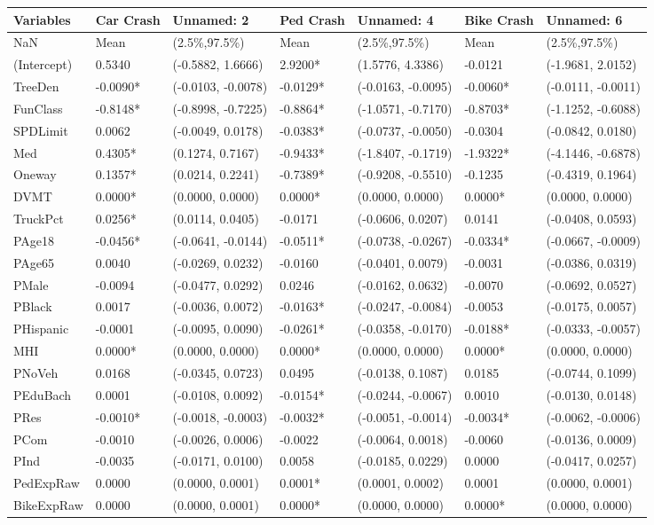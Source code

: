 \begin{tabular}{lllllll}
\toprule
Variables & Car Crash & Unnamed: 2 & Ped Crash & Unnamed: 4 & Bike Crash & Unnamed: 6 \\
\midrule
NaN & Mean & (2.5\%,97.5\%) & Mean & (2.5\%,97.5\%) & Mean & (2.5\%,97.5\%) \\
(Intercept) & 0.5340 & (-0.5882, 1.6666) & 2.9200* & (1.5776, 4.3386) & -0.0121 & (-1.9681, 2.0152) \\
TreeDen & -0.0090* & (-0.0103, -0.0078) & -0.0129* & (-0.0163, -0.0095) & -0.0060* & (-0.0111, -0.0011) \\
FunClass & -0.8148* & (-0.8998, -0.7225) & -0.8864* & (-1.0571, -0.7170) & -0.8703* & (-1.1252, -0.6088) \\
SPDLimit & 0.0062 & (-0.0049, 0.0178) & -0.0383* & (-0.0737, -0.0050) & -0.0304 & (-0.0842, 0.0180) \\
Med & 0.4305* & (0.1274, 0.7167) & -0.9433* & (-1.8407, -0.1719) & -1.9322* & (-4.1446, -0.6878) \\
Oneway & 0.1357* & (0.0214, 0.2241) & -0.7389* & (-0.9208, -0.5510) & -0.1235 & (-0.4319, 0.1964) \\
DVMT & 0.0000* & (0.0000, 0.0000) & 0.0000* & (0.0000, 0.0000) & 0.0000* & (0.0000, 0.0000) \\
TruckPct & 0.0256* & (0.0114, 0.0405) & -0.0171 & (-0.0606, 0.0207) & 0.0141 & (-0.0408, 0.0593) \\
PAge18 & -0.0456* & (-0.0641, -0.0144) & -0.0511* & (-0.0738, -0.0267) & -0.0334* & (-0.0667, -0.0009) \\
PAge65 & 0.0040 & (-0.0269, 0.0232) & -0.0160 & (-0.0401, 0.0079) & -0.0031 & (-0.0386, 0.0319) \\
PMale & -0.0094 & (-0.0477, 0.0292) & 0.0246 & (-0.0162, 0.0632) & -0.0070 & (-0.0692, 0.0527) \\
PBlack & 0.0017 & (-0.0036, 0.0072) & -0.0163* & (-0.0247, -0.0084) & -0.0053 & (-0.0175, 0.0057) \\
PHispanic & -0.0001 & (-0.0095, 0.0090) & -0.0261* & (-0.0358, -0.0170) & -0.0188* & (-0.0333, -0.0057) \\
MHI & 0.0000* & (0.0000, 0.0000) & 0.0000* & (0.0000, 0.0000) & 0.0000* & (0.0000, 0.0000) \\
PNoVeh & 0.0168 & (-0.0345, 0.0723) & 0.0495 & (-0.0138, 0.1087) & 0.0185 & (-0.0744, 0.1099) \\
PEduBach & 0.0001 & (-0.0108, 0.0092) & -0.0154* & (-0.0244, -0.0067) & 0.0010 & (-0.0130, 0.0148) \\
PRes & -0.0010* & (-0.0018, -0.0003) & -0.0032* & (-0.0051, -0.0014) & -0.0034* & (-0.0062, -0.0006) \\
PCom & -0.0010 & (-0.0026, 0.0006) & -0.0022 & (-0.0064, 0.0018) & -0.0060 & (-0.0136, 0.0009) \\
PInd & -0.0035 & (-0.0171, 0.0100) & 0.0058 & (-0.0185, 0.0229) & 0.0000 & (-0.0417, 0.0257) \\
PedExpRaw & 0.0000 & (0.0000, 0.0001) & 0.0001* & (0.0001, 0.0002) & 0.0001 & (0.0000, 0.0001) \\
BikeExpRaw & 0.0000 & (0.0000, 0.0001) & 0.0000* & (0.0000, 0.0000) & 0.0000* & (0.0000, 0.0000) \\
\bottomrule
\end{tabular}
